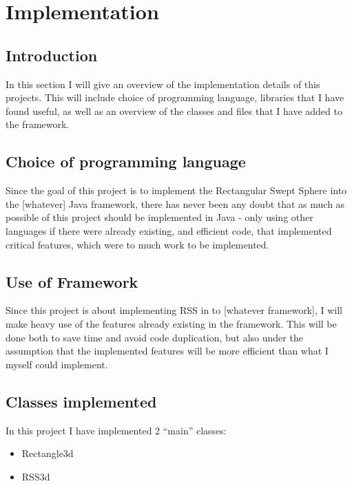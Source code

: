 
\section{Implementation}
\label{implementation}

\subsection{Introduction}
In this section I will give an overview of the implementation details of this projects. This will include choice of programming language, libraries that I have found useful, as well as an overview of the classes and files that I have added to the framework.

\subsection{Choice of programming language}
Since the goal of this project is to implement the Rectangular Swept Sphere into the [whatever]  Java framework, there has never been any doubt that as much as possible of this project should be implemented in Java - only using other languages if there were already existing, and efficient code, that implemented critical features, which were to much work to be implemented.

\subsection{Use of Framework}
Since this project is about implementing RSS in to [whatever framework], I will make heavy use of the features already existing in the framework. This will be done both to save time and avoid code duplication, but also under the assumption that the implemented features will be more efficient than what I myself could implement.

\subsection{Classes implemented}
In this project I have implemented 2 ``main'' classes:
\begin{itemize}
\item Rectangle3d
\item RSS3d
\end{itemize}


